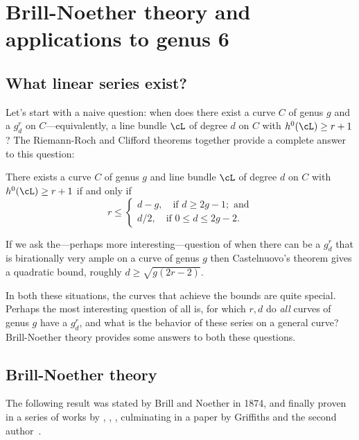 

\chapter{Brill-Noether theory and applications to genus 6}\label{Brill-Noether}\label{BNChapter}

\section{What linear series exist?}

Let's start with a naive question: when does there exist a curve $C$ of genus $g$ and a $g^r_d$ on $C$---equivalently, a line bundle $\cL$ of degree $d$ on $C$ with $h^0(\cL) \geq r+1$? The Riemann-Roch and Clifford theorems together provide a complete answer to this question:

\begin{theorem}\label{arbitrary linear series}
There exists a curve $C$ of genus $g$ and line bundle $\cL$ of degree $d$ on $C$ with $h^0(\cL) \geq r+1$ if and only if
$$
r \leq
\begin{cases}
d-g, \quad \text{if } d \geq 2g-1; \text{ and} \\
d/2,  \quad \text{if } 0 \leq d \leq 2g-2.
\end{cases}
$$
\end{theorem}


If we ask the---perhaps more interesting---question of when there can be a $g^r_d$ that is birationally
very ample on a curve of genus $g$ then Castelnuovo's theorem gives a quadratic bound, roughly $d \geq \sqrt{g(2r-2)}$.

In both these situations, the curves that achieve the bounds are quite special. Perhaps the most interesting question of all is, for which $r,d$ do \emph{all} curves of genus $g$ have a $g^r_d$, and what is the
behavior of these series on a general curve? Brill-Noether theory provides some answers to both these questions.

\section{Brill-Noether theory}

The following result was stated by Brill and Noether in 1874, and finally proven in a series of works by
\cite{Kempf}, \cite{MR323792}, \cite{MR0357398}, \cite{Kleiman-special} culminating in a paper by
Griffiths and the second author~\cite{Griffiths-Harris-BN}.


